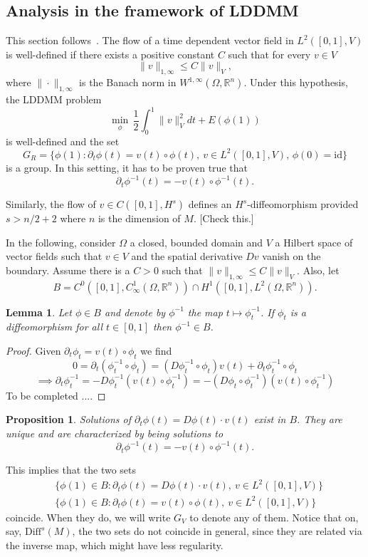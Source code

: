 \documentclass{article}
\theoremstyle{plain}
\newtheorem{prop}[teo]{Proposition}
\newtheorem{lem}[teo]{Lemma}
\theoremstyle{definition}
\numberwithin{equation}{section}
\newcommand{\R}{\ensuremath{\mathbb{R}}}
\newcommand{\Diff}{\ensuremath{\mathrm{Diff}}}
\newcommand{\id}{\ensuremath{\mathrm{id}}}
\begin{document}
\subsection{Analysis in the framework of LDDMM}
This section follows~\cite{schmah2015diffeomorphic}.
The flow of a time dependent vector field in $L^2([0,1],V)$ is well-defined if there exists a positive constant $C$ such that for every $v\in V$
\[
\|v\|_{1,\infty}\leq C\|v\|_V,
\]
where $\|\cdot\|_{1,\infty}$ is the Banach norm in $W^{1,\infty}(\Omega,\R^n)$. Under this hypothesis, the LDDMM problem
\[
  \min_\phi \,\frac{1}{2}\int_0^1\|v\|^2_Vdt + E(\phi(1))
\]
is well-defined and the set
\[
  G_R=\{\phi(1) : \partial_t\phi(t)=v(t)\circ\phi(t),\ v\in L^2([0,1],V),\,\phi(0)=\id\}
\]
is a group. In this setting, it has to be proven true that
\[
\partial_t\phi^{-1}(t)=-v(t)\circ \phi^{-1}(t).
\]

Similarly, the flow of $v\in C([0,1],H^s)$ defines an $H^s$-diffeomorphism provided $s>n/2+2$ where $n$ is the dimension of $M$. [Check this.]

In the following, consider $\Omega$ a closed, bounded domain and $V$ a Hilbert space of vector fields such that $v\in V$ and the spatial derivative $Dv$ vanish on the boundary. Assume there is a $C>0$ such that $\|v\|_{1,\infty}\leq C\|v\|_V$. Also, let
\[
B=C^0([0,1],C^1_\infty(\Omega,\R^n))\cap H^1([0,1],L^2(\Omega,\R^n)).
\]

\begin{lem}
Let $\phi\in B$ and denote by $\phi^{-1}$ the map $t\mapsto \phi_t^{-1}$. If $\phi_t$ is a diffeomorphism for all $t\in[0,1]$ then $\phi^{-1}\in B$.
\end{lem}

\begin{proof}
Given $\partial_t\phi_t = v(t)\circ \phi_t$ we find
\[
 0= \partial_t(\phi^{-1}_t\circ\phi_t )=\left(D\phi^{-1}_t\circ \phi_t\right) v(t)+\partial_t\phi^{-1}_t\circ\phi_t 
\]
\[
\implies \partial_t\phi^{-1}_t=-D\phi_t^{-1} \left(v(t)\circ\phi_t^{-1}\right)=-\left(D\phi_t\circ\phi_t^{-1}\right)\left(v(t)\circ\phi_t^{-1}\right)
\]
To be completed ....
\end{proof}

\begin{prop}
Solutions of $\partial_t\phi(t)=D\phi(t)\cdot v(t)$ exist in $B$. They are unique and are characterized by being solutions to 
\[
\partial_t\phi^{-1}(t)=-v(t)\circ \phi^{-1}(t).
\]
\end{prop}
This implies that the two sets
%
\begin{align*}
&\{\phi(1)\in B : \partial_t\phi(t)=D\phi(t)\cdot v(t),\ v\in L^2([0,1],V)\} \\
&\{\phi(1)\in B : \partial_t\phi(t)=v(t)\circ \phi(t),\ v\in L^2([0,1],V)\}
\end{align*}
%
coincide. When they do, we will write $G_V$ to denote any of them. Notice that on, say, $\Diff^s(M)$, the two sets do not coincide in general, since they are related via the inverse map, which might have less regularity.
\end{document}
